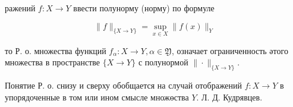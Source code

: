 \documentclass[10pt]{article}
\begin{document}
ражений $f: X \rightarrow Y$ ввести полунорму (норму) по формуле



\[

\|f\|_{\{X \rightarrow Y\}}=\sup _{x \in X}\|f(x)\|_{Y}

\]



то Р. о. множества функций $f_{\alpha}: X \rightarrow Y, \alpha \in \mathfrak{Y}$, означает ограниченность әтого множества в пространстве $\{X \rightarrow Y\}$ с полунормой $\|\cdot\|_{\{X \rightarrow Y\}}$.



Понятие Р. о. снизу и сверху обобщается на случай отображений $f: X \rightarrow Y$ в упорядоченные в том или ином смысле множөства $Y$. Л. Д. Кудрявцев.
\end{document}

